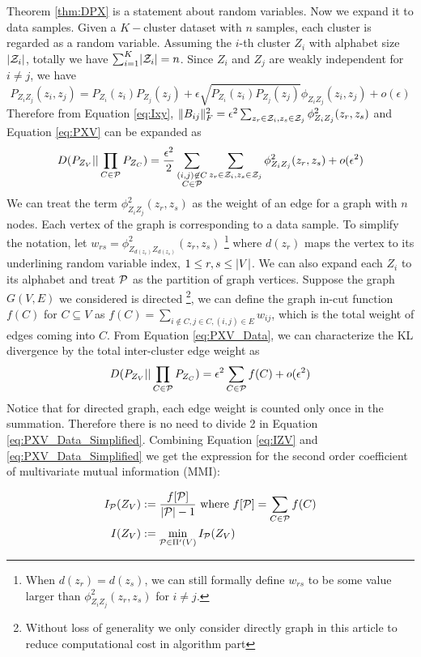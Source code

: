 Theorem \ref{thm:DPX} is a statement about random variables. Now we expand it to data samples. Given a $K-$cluster dataset with $n$ samples, each cluster is regarded as a random variable. 
Assuming the $i$-th cluster $Z_i$ with alphabet size $\abs{\mathcal{Z}_i}$, totally
we have $\sum_{i=1}^K \abs{\mathcal{Z}_i} = n$.
Since $Z_i$ and $Z_j$ are weakly independent for $i\neq j$, we have
\begin{equation}\label{eq:phi_w}
P_{Z_i Z_j}(z_i, z_j) = P_{Z_i}(z_i)P_{Z_j}(z_j) + \epsilon \sqrt{P_{Z_i}(z_i)P_{Z_j}(z_j)} \phi_{Z_i Z_j}(z_i, z_j) + o(\epsilon)
\end{equation}
Therefore from Equation \eqref{eq:Ixy}, $\norm{B_{ij}}_F^2 = \epsilon^2 \sum_{z_r \in \mathcal{Z}_i, z_s \in \mathcal{Z}_j} \phi^2_{Z_i Z_j}(z_r, z_s)$ and Equation \eqref{eq:PXV} can be expanded as
\begin{equation}\label{eq:PXV_Data}
D(P_{Z_V} || \prod_{C\in \P} P_{Z_{C}}) =
{\epsilon^2\over 2}\sum_{\substack{(i,j) \not\in C\\ C\in \P}}
\sum_{z_r \in \mathcal{Z}_i, z_s \in \mathcal{Z}_j}  \phi^2_{Z_i Z_j}(z_r, z_s) + o(\epsilon^2)
\end{equation}
We can treat the term
$\phi^2_{Z_i Z_j}(z_r, z_s)$ as the weight of an edge for a graph with $n$ nodes.
Each vertex of the graph is corresponding to a data sample.
To simplify the notation, let $w_{rs} = \phi^2_{Z_{d(z_r)}Z_{d(z_s)}}(z_r, z_s)$ \footnote{When $d(z_r) = d(z_s)$, we can still formally define $w_{rs}$ to be some value larger than $\phi^2_{Z_i Z_j}(z_r, z_s)$ for $i\neq j$.} where $d(z_r)$ maps the vertex to its underlining random variable index, $1\leq r,s \leq \abs{V}$.
We can also expand each $Z_i$ to its alphabet and treat $\P$ as the partition of graph vertices.
Suppose the graph $G(V, E)$ we considered is directed
\footnote{Without loss of generality we only consider directly graph in this article to reduce computational cost in algorithm part},
we can define the graph in-cut function $f(C)$ for $C\subseteq V$ as $f(C) = \sum_{i\not\in C, j\in C, (i,j) \in E} w_{ij}$, which is the total weight of edges coming
into $C$.
From Equation \eqref{eq:PXV_Data}, we can characterize the KL divergence by the total inter-cluster edge weight as
\begin{equation}\label{eq:PXV_Data_Simplified}
D(P_{Z_V} || \prod_{C\in \P} P_{Z_{C}}) = \epsilon^2 \sum_{C \in \P} f(C)+ o(\epsilon^2)
\end{equation}
Notice that for directed graph, each edge weight is counted only once in the summation. Therefore there is no need to divide 2 in
Equation \eqref{eq:PXV_Data_Simplified}.
Combining Equation \eqref{eq:IZV} and \eqref{eq:PXV_Data_Simplified} we get the expression for the second order coefficient of multivariate mutual information (MMI):
\begin{definition}\label{def:ms}
	\begin{align}
	I_{\P}(Z_V) & := \frac{ f[\P] }{  \abs{\mathcal{P}} - 1 } \textrm{ where } f[\P] = \sum_{C\in \P}f(C) \label{eq:ms_first}\\
	I(Z_V) & := \min_{\mathcal{P} \in \Pi'(V)} I_{\mathcal{P}}(Z_V)  \label{eq:ms}
	\end{align}
\end{definition}

